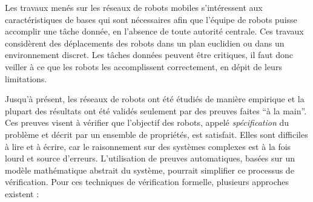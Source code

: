 Les travaux menés sur les réseaux de robots mobiles s'intéressent aux
caractéristiques de bases qui sont nécessaires afin que l'équipe de
robots puisse accomplir une tâche donnée, en l'absence de toute
autorité centrale. Ces travaux considèrent des déplacements des robots
dans un plan euclidien ou dans un environnement discret.  Les tâches
données peuvent être critiques, il faut donc veiller à ce que les
robots les accomplissent correctement, en dépit de leurs limitations.

Jusqu'à présent, les réseaux de robots ont été étudiés de manière
empirique et la plupart des résultats ont été validés seulement par
des preuves faites ``à la main''. Ces preuves visent à vérifier que
l'objectif des robots, appelé \emph{spécification} du problème et
décrit par un ensemble de propriétés, est satisfait. Elles sont
difficiles à lire et à écrire, car le raisonnement sur des systèmes
complexes est à la fois lourd et source d'erreurs.  L'utilisation de
preuves automatiques, basées sur un modèle mathématique abstrait du
système, pourrait simplifier ce processus de vérification. Pour ces
techniques de vérification formelle, plusieurs approches existent :
